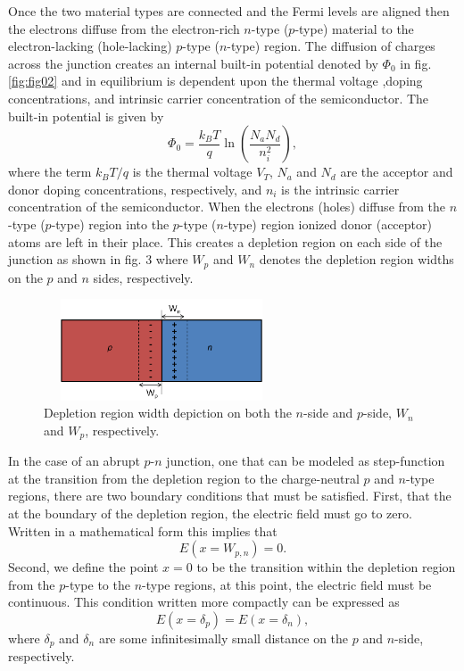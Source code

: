 Once the two material types are connected and the Fermi levels are aligned then the electrons
diffuse from the electron-rich $n$-type ($p$-type) material to the electron-lacking (hole-lacking)
$p$-type ($n$-type) region. The diffusion of charges across the junction creates an internal
built-in potential denoted by $\Phi_0$ in fig. \ref{fig:fig02} and in equilibrium is dependent upon 
the thermal voltage ,doping concentrations, and intrinsic carrier concentration of the semiconductor. 
The built-in potential is given by 
\begin{equation}
    \label{eq:phi0_eq}
    \Phi_0 = \frac{k_BT}{q}\ln{\left(\frac{N_aN_d}{n_i^2}\right)},
\end{equation}
where the term $k_BT/q$ is the thermal voltage $V_T$, $N_a$ and $N_d$ are the acceptor and donor doping concentrations, respectively, and
$n_i$ is the intrinsic carrier concentration of the semiconductor. When the electrons (holes) diffuse from the $n$-type ($p$-type) 
region into the $p$-type ($n$-type) region ionized donor (acceptor) atoms are left in their place. This creates a depletion region on each side of the 
junction as shown in fig. 3 where $W_p$ and $W_n$ denotes the depletion region widths on the $p$ and $n$
sides, respectively. 
\begin{figure}[h!]\label{fig:fig03}
    \centering
    \includegraphics[height=3cm,width=7cm]{figs/unbias_pn_junction_depletion_region}
    \caption{Depletion region width depiction on both the $n$-side and $p$-side, $W_n$ and $W_p$, respectively.}
\end{figure}
In the case of an abrupt $p$-$n$ junction, one that can be modeled as step-function at the transition
from the depletion region to the charge-neutral $p$ and $n$-type regions, there are two boundary conditions that must be 
satisfied. First, that the at the boundary of the depletion region, the electric field must go to zero. Written in 
a mathematical form this implies that 
\begin{equation}
    \label{eq:bc1}
    E(x=W_{p,n}) = 0.
\end{equation}
Second, we define the point $x = 0$ to be the transition within the depletion region from the $p$-type to the $n$-type regions, at this point, the 
electric field must be continuous. This condition written more compactly can be expressed as
\begin{equation}
    \label{eq:bc2}
    E(x = \delta_{p}) = E(x = \delta_{n}),
\end{equation}
where $\delta_p$ and $\delta_n$ are some infinitesimally small distance on the $p$ and $n$-side, respectively. 


